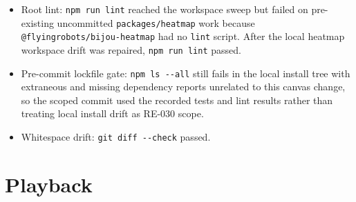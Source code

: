 \begin{itemize}
\item
  Root lint: \texttt{n\allowbreak{}p\allowbreak{}m\allowbreak{} \allowbreak{}r\allowbreak{}u\allowbreak{}n\allowbreak{} \allowbreak{}l\allowbreak{}i\allowbreak{}n\allowbreak{}t} reached the workspace sweep but failed on pre-existing uncommitted \texttt{p\allowbreak{}a\allowbreak{}c\allowbreak{}k\allowbreak{}a\allowbreak{}g\allowbreak{}e\allowbreak{}s\allowbreak{}/\allowbreak{}h\allowbreak{}e\allowbreak{}a\allowbreak{}t\allowbreak{}m\allowbreak{}a\allowbreak{}p} work because \texttt{@\allowbreak{}f\allowbreak{}l\allowbreak{}y\allowbreak{}i\allowbreak{}n\allowbreak{}g\allowbreak{}r\allowbreak{}o\allowbreak{}b\allowbreak{}o\allowbreak{}t\allowbreak{}s\allowbreak{}/\allowbreak{}b\allowbreak{}i\allowbreak{}j\allowbreak{}o\allowbreak{}u\allowbreak{}-\allowbreak{}h\allowbreak{}e\allowbreak{}a\allowbreak{}t\allowbreak{}m\allowbreak{}a\allowbreak{}p} had no \texttt{l\allowbreak{}i\allowbreak{}n\allowbreak{}t} script. After the local heatmap workspace drift was repaired, \texttt{n\allowbreak{}p\allowbreak{}m\allowbreak{} \allowbreak{}r\allowbreak{}u\allowbreak{}n\allowbreak{} \allowbreak{}l\allowbreak{}i\allowbreak{}n\allowbreak{}t} passed.
\item
  Pre-commit lockfile gate: \texttt{n\allowbreak{}p\allowbreak{}m\allowbreak{} \allowbreak{}l\allowbreak{}s\allowbreak{} \allowbreak{}-\allowbreak{}-\allowbreak{}a\allowbreak{}l\allowbreak{}l} still fails in the local install tree with extraneous and missing dependency reports unrelated to this canvas change, so the scoped commit used the recorded tests and lint results rather than treating local install drift as RE-030 scope.
\item
  Whitespace drift: \texttt{g\allowbreak{}i\allowbreak{}t\allowbreak{} \allowbreak{}d\allowbreak{}i\allowbreak{}f\allowbreak{}f\allowbreak{} \allowbreak{}-\allowbreak{}-\allowbreak{}c\allowbreak{}h\allowbreak{}e\allowbreak{}c\allowbreak{}k} passed.
\end{itemize}

\section{Playback}\label{record-158-playback}

